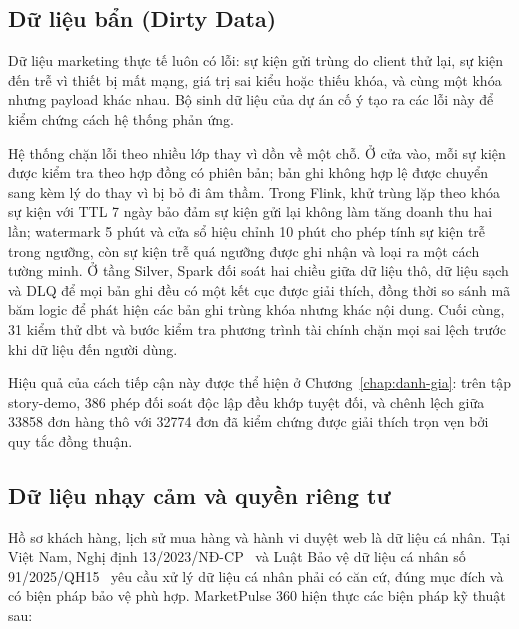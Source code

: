 \subsection{Dữ liệu bẩn (Dirty Data)}
\label{sec:c6-dirty-data}
Dữ liệu marketing thực tế luôn có lỗi: sự kiện gửi trùng do client thử lại, sự kiện đến trễ vì thiết bị mất mạng, giá trị sai kiểu hoặc thiếu khóa, và cùng một khóa nhưng payload khác nhau. Bộ sinh dữ liệu của dự án cố ý tạo ra các lỗi này để kiểm chứng cách hệ thống phản ứng.

Hệ thống chặn lỗi theo nhiều lớp thay vì dồn về một chỗ. Ở cửa vào, mỗi sự kiện được kiểm tra theo hợp đồng có phiên bản; bản ghi không hợp lệ được chuyển sang  kèm lý do thay vì bị bỏ đi âm thầm. Trong Flink, khử trùng lặp theo khóa sự kiện với TTL 7 ngày bảo đảm sự kiện gửi lại không làm tăng doanh thu hai lần; watermark 5 phút và cửa sổ hiệu chỉnh 10 phút cho phép tính sự kiện trễ trong ngưỡng, còn sự kiện trễ quá ngưỡng được ghi nhận và loại ra một cách tường minh. Ở tầng Silver, Spark đối soát hai chiều giữa dữ liệu thô, dữ liệu sạch và DLQ để mọi bản ghi đều có một kết cục được giải thích, đồng thời so sánh mã băm logic để phát hiện các bản ghi trùng khóa nhưng khác nội dung. Cuối cùng, 31 kiểm thử dbt và bước kiểm tra phương trình tài chính chặn mọi sai lệch trước khi dữ liệu đến người dùng.

Hiệu quả của cách tiếp cận này được thể hiện ở Chương~\ref{chap:danh-gia}: trên tập story-demo, \num{386} phép đối soát độc lập đều khớp tuyệt đối, và chênh lệch giữa \num{33858} đơn hàng thô với \num{32774} đơn đã kiểm chứng được giải thích trọn vẹn bởi quy tắc đồng thuận.

\subsection{Dữ liệu nhạy cảm và quyền riêng tư}
\label{sec:c6-privacy}
Hồ sơ khách hàng, lịch sử mua hàng và hành vi duyệt web là dữ liệu cá nhân. Tại Việt Nam, Nghị định 13/2023/NĐ-CP~\cite{nd13} và Luật Bảo vệ dữ liệu cá nhân số 91/2025/QH15~\cite{pdpl2025} yêu cầu xử lý dữ liệu cá nhân phải có căn cứ, đúng mục đích và có biện pháp bảo vệ phù hợp. MarketPulse 360 hiện thực các biện pháp kỹ thuật sau:

